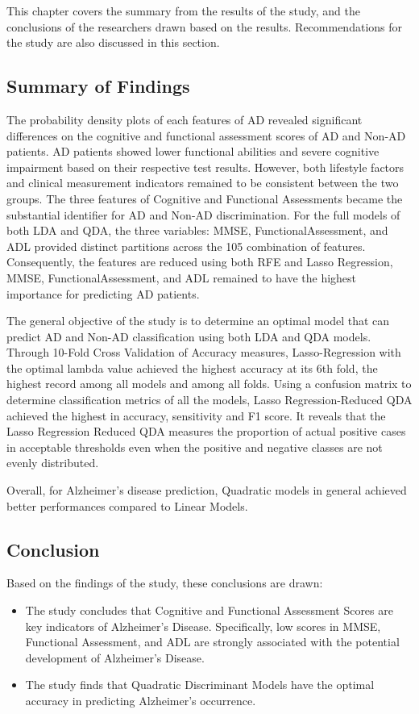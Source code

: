 \documentclass[12pt]{article}
\begin{document}
This chapter covers the summary from the results of the study, and the conclusions of the researchers drawn based on the results. Recommendations for the study are also discussed in this section. 

\subsection{Summary of Findings}
\noindent

The probability density plots of each features of AD revealed significant differences on the cognitive and functional assessment scores of AD and Non-AD patients. AD patients showed lower functional abilities and 
severe cognitive impairment based on their respective test results. However, both lifestyle factors and clinical measurement indicators remained to be consistent between the two groups. The three features of Cognitive and 
Functional Assessments became the substantial identifier for AD and Non-AD discrimination. For the full models of both LDA and QDA, the three variables: MMSE, FunctionalAssessment, and ADL provided distinct partitions across the 
105 combination of features. Consequently, the features are reduced using both RFE and Lasso Regression, MMSE, FunctionalAssessment, and ADL remained to have the highest importance for predicting AD patients. 

The general objective of the study is to determine an optimal model that can predict AD and Non-AD classification using both LDA and QDA models. Through 10-Fold Cross Validation of Accuracy measures, Lasso-Regression with the optimal lambda value achieved
the highest accuracy at its 6th fold, the highest record among all models and among all folds. Using a confusion matrix to determine classification metrics of all the models, Lasso Regression-Reduced QDA achieved the highest in accuracy, sensitivity and F1 score. 
It reveals that the Lasso Regression Reduced QDA measures the proportion of actual positive cases in acceptable thresholds even when the positive and negative classes are not evenly distributed. 

Overall, for Alzheimer's disease prediction, Quadratic models in general achieved better performances compared to Linear Models. 

\subsection{Conclusion}
Based on the findings of the study, these conclusions are drawn: 
\begin{itemize}
    \item The study concludes that Cognitive and Functional Assessment Scores are key indicators of Alzheimer's Disease. Specifically, low scores in MMSE, Functional Assessment, and ADL are strongly associated with the potential development of Alzheimer's Disease.
    \item The study finds that Quadratic Discriminant Models have the optimal accuracy in predicting Alzheimer's occurrence. 
\end{itemize}
\end{document}
